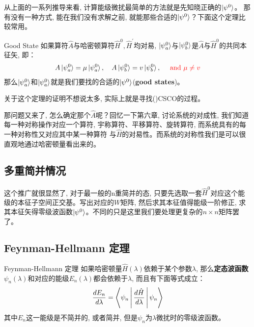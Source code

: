 \documentclass[a4paper,zihao=-4,linespread=1]{ctexrep}
\begin{document}
    从上面的一系列推导来看, 计算能级微扰最简单的方法就是先知晓正确的$\ket{\psi^0}$。 那有没有一种方式, 能在我们没有求解之前, 就能那些合适的$\ket{\psi^0}$？下面这个定理比较常用。
    \begin{theorem}{Good State}
        如果算符$\hat A$与哈密顿算符$\hat{H}^0,\hat{H}^\prime$均对易, $\ket{\psi^0_a}$与$\ket{\psi^0_b}$是$\hat A$与$\hat{H}^0$的共同本征矢, 即：
        \[A \ket{\psi_a^0}=\mu \ket{\psi_a^0}, \quad A \ket{\psi_b^0}=v \ket{\psi_b^0}, \quad {\color{red}\text { and } \mu \neq v}\]
        那么$\ket{\psi_a^0}$和$\ket{\psi_a^0}$就是我们要找的合适的$\ket{\psi^0}$(\textbf{good states})。
    \end{theorem}

    关于这个定理的证明不想说太多, 实际上就是寻找()CSCO的过程。

    那问题又来了, 怎么确定那个$\hat{A}$呢？回忆一下第六章, 讨论系统的对成性, 我们知道每一种对称操作对应一个算符, 宇称算符、平移算符、旋转算符, 而系统具有的每一种对称性又对应其中某一种算符
    与$\hat{H}$的对易性。而系统的对称性我们是可以很直观地通过哈密顿量看出来的。

    \subsection*{多重简并情况}
    这个推广就很显然了, 对于最一般的n重简并的态, 只要先选取一套$\hat{H}^0$对应这个能级的本征子空间正交基。写出对应的$W$矩阵, 然后求其本征值得能级一阶修正, 
    求其本征矢得零级波函数$\ket{\psi^0}$。不同的只是这里我们要处理更复杂的$n\times n$矩阵罢了。
    
    \subsection*{Feynman-Hellmann 定理}
    \begin{theorem}{Feynman-Hellmann 定理}
        如果哈密顿量$\hat{H}(\lambda)$依赖于某个参数$\lambda$, 那么\textbf{定态波函数}$\psi_n(\lambda)$和对应的能级$E_n(\lambda)$都会依赖于$\lambda$, 而且有下面等式成立：
        \begin{equation}
            \label{eq:fht}
            \frac{dE_n}{d\lambda}=\Braket{\psi_n|\frac{d\hat{H}}{d\lambda}|\psi_n}
        \end{equation}
        其中$E_n$这一能级是不简并的, 或者简并, 但是$\psi_n$为$\lambda$微扰时的零级波函数。
    \end{theorem}
    
\end{document}

